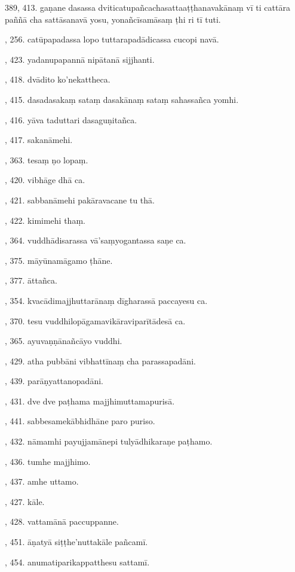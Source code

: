389, 413. gaṇane dasassa dviticatupañcachasattaaṭṭhanavakānaṃ vī ti cattāra paññā cha sattāsanavā yosu, yonañcīsamāsaṃ ṭhi ri tī tuti.\par {}, 256. catūpapadassa lopo tuttarapadādicassa cucopi navā.\par {}, 423. yadanupapannā nipātanā sijjhanti.\par {}, 418. dvādito ko’nekattheca.\par {}, 415. dasadasakaṃ sataṃ dasakānaṃ sataṃ sahassañca yomhi.\par {}, 416. yāva taduttari dasaguṇitañca.\par {}, 417. sakanāmehi.\par {}, 363. tesaṃ ṇo lopaṃ.\par {}, 420. vibhāge dhā ca.\par {}, 421. sabbanāmehi pakāravacane tu thā.\par {}, 422. kimimehi thaṃ.\par {}, 364. vuddhādisarassa vā’saṃyogantassa saṇe ca.\par {}, 375. māyūnamāgamo ṭhāne.\par {}, 377. āttañca.\par {}, 354. kvacādimajjhuttarānaṃ dīgharassā paccayesu ca.\par {}, 370. tesu vuddhilopāgamavikāraviparītādesā ca.\par {}, 365. ayuvaṇṇānañcāyo vuddhi.\par {}, 429. atha pubbāni vibhattīnaṃ cha parassapadāni.\par {}, 439. parāṇyattanopadāni.\par {}, 431. dve dve paṭhama majjhimuttamapurisā.\par {}, 441. sabbesamekābhidhāne paro puriso.\par {}, 432. nāmamhi payujjamānepi tulyādhikaraṇe paṭhamo.\par {}, 436. tumhe majjhimo.\par {}, 437. amhe uttamo.\par {}, 427. kāle.\par {}, 428. vattamānā paccuppanne.\par {}, 451. āṇatyā siṭṭhe’nuttakāle pañcamī.\par {}, 454. anumatiparikappatthesu sattamī.\par \noindent
